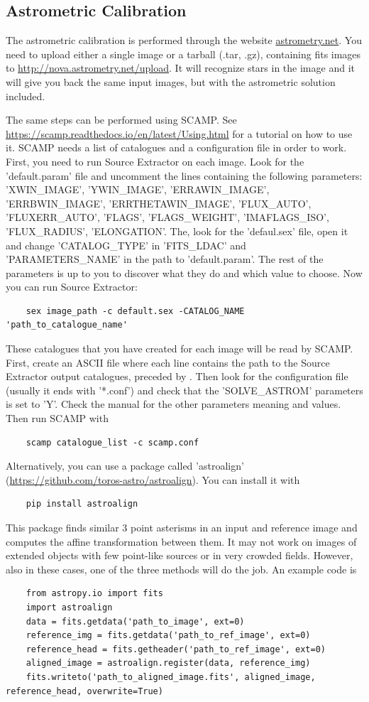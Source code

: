 \documentclass[a4paper, 11pt, fleqn]{memoir}
\begin{document}
\subsection{Astrometric Calibration}

The astrometric calibration is performed through the website \url{astrometry.net}.
You need to upload either a single image or a tarball (.tar, .gz), containing fits images to \url{http://nova.astrometry.net/upload}.
It will recognize stars in the image and it will give you back the same input images, but with the astrometric solution included.

The same steps can be performed using SCAMP.
See \url{https://scamp.readthedocs.io/en/latest/Using.html} for a tutorial on how to use it.
SCAMP needs a list of catalogues and a configuration file in order to work.
First, you need to run Source Extractor on each image.
Look for the 'default.param' file and uncomment the lines containing the following parameters: 'XWIN\_IMAGE', 'YWIN\_IMAGE', 'ERRAWIN\_IMAGE', 'ERRBWIN\_IMAGE', 'ERRTHETAWIN\_IMAGE', 'FLUX\_AUTO', 'FLUXERR\_AUTO', 'FLAGS', 'FLAGS\_WEIGHT', 'IMAFLAGS\_ISO', 'FLUX\_RADIUS', 'ELONGATION'.
The, look for the 'defaul.sex' file, open it and change 'CATALOG\_TYPE' in 'FITS\_LDAC' and 'PARAMETERS\_NAME' in the path to 'default.param'.
The rest of the parameters is up to you to discover what they do and which value to choose.
Now you can run Source Extractor:
\begin{verbatim}
    sex image_path -c default.sex -CATALOG_NAME 'path_to_catalogue_name'
\end{verbatim}
These catalogues that you have created for each image will be read by SCAMP.
First, create an ASCII file where each line contains the path to the Source Extractor output catalogues, preceded by \@.
Then look for the configuration file (usually it ends with '*.conf') and check that the 'SOLVE\_ASTROM' parameters is set to 'Y'.
Check the manual for the other parameters meaning and values.
Then run SCAMP with
\begin{verbatim}
    scamp catalogue_list -c scamp.conf
\end{verbatim}

Alternatively, you can use a  package called 'astroalign' (\url{https://github.com/toros-astro/astroalign}).
You can install it with
\begin{verbatim}
    pip install astroalign
\end{verbatim}
This package finds similar 3 point asterisms in an input and reference image and computes the affine transformation between them.
It may not work on images of extended objects with few point-like sources or in very crowded fields.
However, also in these cases, one of the three methods will do the job.
An example code is
\begin{verbatim}
    from astropy.io import fits
    import astroalign
    data = fits.getdata('path_to_image', ext=0)
    reference_img = fits.getdata('path_to_ref_image', ext=0)
    reference_head = fits.getheader('path_to_ref_image', ext=0)
    aligned_image = astroalign.register(data, reference_img)
    fits.writeto('path_to_aligned_image.fits', aligned_image, reference_head, overwrite=True)
\end{verbatim}
\end{document}
